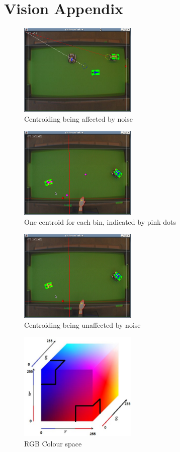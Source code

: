 \section{Vision Appendix}
\label{apx:vision}

\begin{figure}[h!]
  \caption{Centroiding being affected by noise}
  \centering
    \includegraphics[width=0.5\textwidth]{randy_bins_before.png}
\end{figure}

\begin{figure}[h!]
  \caption{One centroid for each bin, indicated by pink dots}
  \centering
    \includegraphics[width=0.5\textwidth]{randy_bins_after_mult.png}
\end{figure}

\begin{figure}[h!]
  \caption{Centroiding being unaffected by noise}
  \centering
    \includegraphics[width=0.5\textwidth]{randy_bins_after.png}
\end{figure}

\begin{figure}[h!]
  \caption{RGB Colour space}
  \centering
    \includegraphics[width=0.5\textwidth]{RGB_Space.jpg}
\end{figure}



